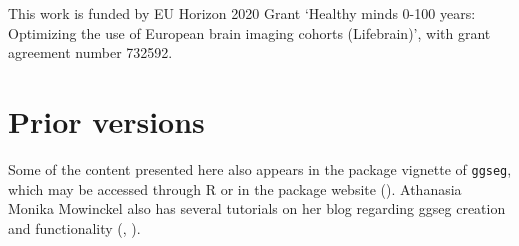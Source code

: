 \documentclass[fleqn,10pt]{wlpeerj} %
\begin{document}
This work is funded by EU Horizon 2020 Grant `Healthy minds 0-100 years: Optimizing the use of European brain imaging cohorts (Lifebrain)', with grant agreement number 732592.

\hypertarget{prior-versions}{%
\section{Prior versions}\label{prior-versions}}

Some of the content presented here also appears in the package vignette of \texttt{ggseg}, which may be accessed through R or in the package website (\citet{ggseg}).
Athanasia Monika Mowinckel also has several tutorials on her blog regarding ggseg creation and functionality (\citet{ggsegAnim}, \citet{ggsegIntro}).

\renewcommand\refname{References}

\end{document}
